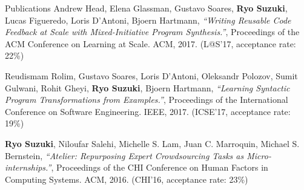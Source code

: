 \documentclass{resume} %
\begin{document}
\begin{rSection}{Publications}
Andrew Head, Elena Glassman, Gustavo Soares, {\bf Ryo Suzuki}, Lucas Figueredo, Loris D'Antoni, Bjoern Hartmann, 
{\it ``Writing Reusable Code Feedback at Scale with Mixed-Initiative Program Synthesis.''}, 
Proceedings of the ACM Conference on Learning at Scale. ACM, 2017. 
(L@S'17, acceptance rate: 22\%)

Reudismam Rolim, Gustavo Soares, Loris D'Antoni, Oleksandr Polozov, Sumit Gulwani, Rohit Gheyi, {\bf Ryo Suzuki}, Bjoern Hartmann, 
{\it ``Learning Syntactic Program Transformations from Examples.''}, 
Proceedings of the International Conference on Software Engineering. IEEE, 2017. 
(ICSE'17, acceptance rate: 19\%)

{\bf Ryo Suzuki}, Niloufar Salehi, Michelle S. Lam,
Juan C. Marroquin, Michael S. Bernstein,
{\it ``Atelier: Repurposing Expert Crowdsourcing Tasks as Micro-internships.''}, 
Proceedings of the CHI Conference on Human Factors in Computing Systems. ACM, 2016. 
(CHI'16, acceptance rate: 23\%)

\end{rSection}



\end{document}
